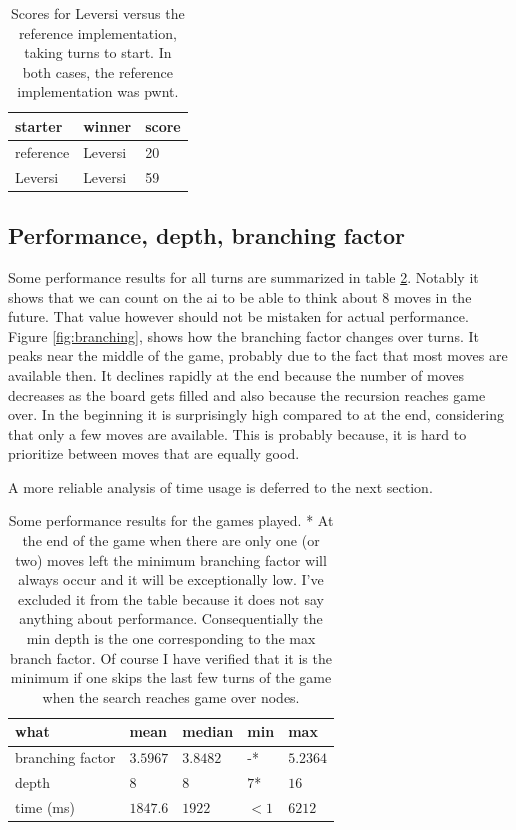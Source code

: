 \documentclass[a4paper,11pt]{article}
\begin{document}
\begin{table}

\centering
\begin{tabular}{|l|l|l|}
\hline
\textbf{starter} & \textbf{winner} & \textbf{score}
\\ \hline
reference & Leversi & 20
\\ \hline
Leversi & Leversi & 59
\\ \hline
\end{tabular}

\caption{Scores for Leversi versus the reference implementation, taking turns to start. In both cases, the reference implementation was pwnt.} \label{tab:score}

\end{table}

\subsection{Performance, depth, branching factor}
Some performance results for all turns are summarized in table \ref{tab:perf}. Notably it shows that we can count on the ai to be able to think about 8 moves in the future. That value however should not be mistaken for actual performance. Figure \ref{fig:branching}, shows how the branching factor changes over turns. It peaks near the middle of the game, probably due to the fact that most moves are available then. It declines rapidly at the end because the number of moves decreases as the board gets filled and also because the recursion reaches game over. In the beginning it is surprisingly high compared to at the end, considering that only a few moves are available. This is probably because, it is hard to prioritize between moves that are equally good.

A more reliable analysis of time usage is deferred to the next section.

\begin{table}

\centering
\begin{tabular}{|l|l|l|l|l|}
\hline
\textbf{what} & \textbf{mean} & \textbf{median} & \textbf{min} & \textbf{max}
\\ \hline
branching factor & $3.5967$ & $3.8482$ & -* & $5.2364$
\\ \hline
depth & $8$ & $8$ & $7$* & $16$
\\ \hline
time (ms) & $1847.6$ & $1922$ & $<1$ & $6212$
\\ \hline
\end{tabular}

\caption{Some performance results for the games played.
\newline
* At the end of the game when there are only one (or two) moves left the minimum branching factor will always occur and it will be exceptionally low. I've excluded it from the table because it does not say anything about performance. Consequentially the min depth is the one corresponding to the max branch factor. Of course I have verified that it is the minimum if one skips the last few turns of the game when the search reaches game over nodes.} \label{tab:perf}

\end{table}
\end{document}
